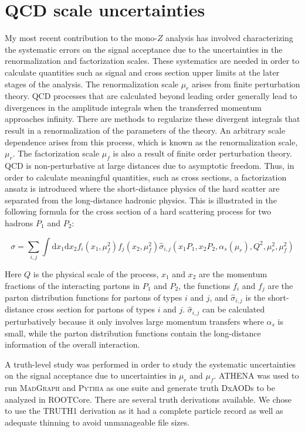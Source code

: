\section{QCD scale uncertainties}
\label{sec:qcd}

My most recent contribution to the mono-$Z$ analysis has involved characterizing the systematic errors on the signal acceptance due to the uncertainties in the renormalization and factorization scales. These systematics are needed in order to calculate quantities such as signal and cross section upper limits at the later stages of the analysis. The renormalization scale $\mu_r$ arises from finite perturbation theory. QCD processes that are calculated beyond leading order generally lead to divergences in the amplitude integrals when the transferred momentum approaches infinity. There are methods to regularize these divergent integrals that result in a renormalization of the parameters of the theory. An arbitrary scale dependence arises from this process, which is known as the renormalization scale, $\mu_r$. The factorization scale $\mu_f$ is also a result of finite order perturbation theory. QCD is non-perturbative at large distances due to asymptotic freedom. Thus, in order to calculate meaningful quantities, such as cross sections, a factorization ansatz is introduced where the short-distance physics of the hard scatter are separated from the long-distance hadronic physics. This is illustrated in the following formula for the cross section of a hard scattering process for two hadrons $P_1$ and $P_2$:

\begin{equation}
\sigma = \sum_{i,j} \int \text{d}x_1 \text{d}x_2 f_{i} (x_1, \mu_f^2) f_{j} (x_2, \mu_f^2) \hat{\sigma}_{i,j} (x_1 P_1, x_2 P_2, \alpha_s(\mu_r), Q^2, \mu_r^2, \mu_f^2)
\end{equation}

\noindent Here $Q$ is the physical scale of the process, $x_1$ and $x_2$ are the momentum fractions of the interacting partons in $P_1$ and $P_2$, the functions $f_i$ and $f_j$ are the parton distribution functions for partons of types $i$ and $j$, and $\hat{\sigma}_{i,j}$ is the short-distance cross section for partons of types $i$ and $j$. $\hat{\sigma}_{i,j}$ can be calculated perturbatively because it only involves large momentum transfers where $\alpha_s$ is small, while the parton distribution functions contain the long-distance information of the overall interaction.

A truth-level study was performed in order to study the systematic uncertainties on the signal acceptance due to uncertainties in $\mu_r$ and $\mu_f$. ATHENA was used to run \textsc{MadGraph} and \textsc{Pythia} as one suite and generate truth DxAODs to be analyzed in ROOTCore. There are several truth derivations available. We chose to use the TRUTH1 derivation as it had a complete particle record as well as adequate thinning to avoid unmanageable file sizes.

